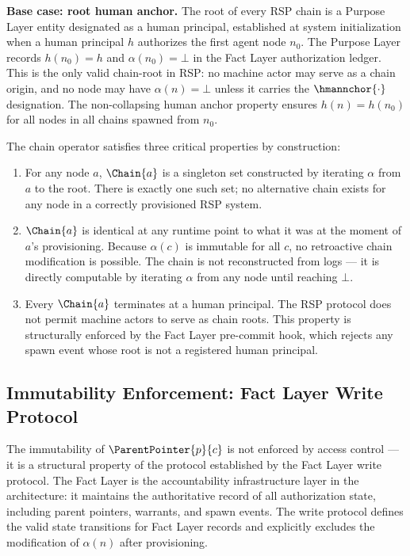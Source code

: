 \medskip
\noindent\textbf{Base case: root human anchor.} The root of every RSP chain is a Purpose Layer entity designated as a human principal, established at system initialization when a human principal $h$ authorizes the first agent node $n_0$. The Purpose Layer records $h(n_0) = h$ and $\alpha(n_0) = \bot$ in the Fact Layer authorization ledger. This is the only valid chain-root in RSP: no machine actor may serve as a chain origin, and no node may have $\alpha(n) = \bot$ unless it carries the $\hmannchor{\cdot}$ designation. The non-collapsing human anchor property ensures $h(n) = h(n_0)$ for all nodes in all chains spawned from $n_0$.

The chain operator satisfies three critical properties by construction:

\begin{enumerate}
\item[(C1) \textbf{Uniqueness}] For any node $a$, $\Chain{a}$ is a singleton set constructed by iterating $\alpha$ from $a$ to the root. There is exactly one such set; no alternative chain exists for any node in a correctly provisioned RSP system.

\item[(C2) \textbf{Determinism}] $\Chain{a}$ is identical at any runtime point to what it was at the moment of $a$'s provisioning. Because $\alpha(c)$ is immutable for all $c$, no retroactive chain modification is possible. The chain is not reconstructed from logs — it is directly computable by iterating $\alpha$ from any node until reaching $\bot$.

\item[(C3) \textbf{Human termination}] Every $\Chain{a}$ terminates at a human principal. The RSP protocol does not permit machine actors to serve as chain roots. This property is structurally enforced by the Fact Layer pre-commit hook, which rejects any spawn event whose root is not a registered human principal.
\end{enumerate}

\subsection{Immutability Enforcement: Fact Layer Write Protocol}
\label{sec:fact-layer-write-protocol}

The immutability of $\ParentPointer{p}{c}$ is not enforced by access control — it is a structural property of the protocol established by the Fact Layer write protocol. The Fact Layer is the accountability infrastructure layer in the \bxthree{} architecture: it maintains the authoritative record of all authorization state, including parent pointers, warrants, and spawn events. The write protocol defines the valid state transitions for Fact Layer records and explicitly excludes the modification of $\alpha(n)$ after provisioning.

